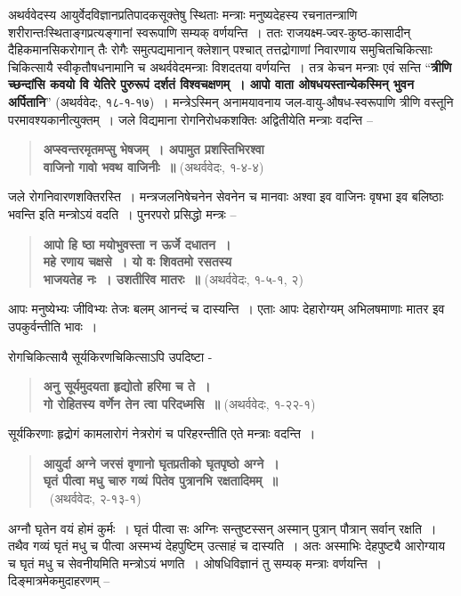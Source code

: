 अथर्ववेदस्य आयुर्वेदविज्ञानप्रतिपादकसूक्तेषु स्थिताः मन्त्राः मनुष्यदेहस्य रचनातन्त्राणि शरीरान्तःस्थिताङ्गप्रत्यङ्गानां स्वरूपाणि सम्यक् वर्णयन्ति~। ततः राजयक्ष्म-ज्वर-कुष्ठ-कासादीन् दैहिकमानसिकरोगान् तैः रोगैः समुत्पद्यमानान् क्लेशान् पश्चात् तत्तद्रोगाणां निवारणाय समुचितचिकित्साः चिकित्सायै स्वीकृतौषधनामानि च अथर्ववेदमन्त्राः विशदतया वर्णयन्ति~। तत्र केचन मन्त्राः एवं सन्ति “\textbf{त्रीणि च्छन्दांसि कवयो वि येतिरे पुरुरूपं दर्शतं विश्वचक्षणम्~। आपो वाता ओषधयस्तान्येकस्मिन् भुवन अर्पितानि}” (अथर्ववेदः, १८-१-१७)~। मन्त्रेऽस्मिन् अनामयावनाय जल-वायु-औषध-स्वरूपाणि त्रीणि वस्तूनि परमावश्यकानीत्युक्तम्~। जले विद्यमाना रोगनिरोधकशक्तिः अद्वितीयेति मन्त्राः वदन्ति –
\begin{verse}
\textbf{अप्स्वन्तरमृतमप्सु भेषजम्~। अपामुत प्रशस्तिभिरश्वा}\\
\textbf{वाजिनो गावो भवथ वाजिनीः~॥} (अथर्ववेदः, १-४-४)
\end{verse}
जले रोगनिवारणशक्तिरस्ति~। मन्त्रजलनिषेचनेन सेवनेन च मानवाः अश्वा इव वाजिनः वृषभा इव बलिष्ठाः भवन्ति इति मन्त्रोऽयं वदति~। पुनरपरो प्रसिद्धो मन्त्रः –

\begin{verse}
\textbf{आपो हि ष्ठा मयोभुवस्ता न ऊर्जे दधातन~।}\\
\textbf{महे रणाय चक्षसे~। यो वः शिवतमो रसतस्य}\\
\textbf{भाजयतेह नः~। उशतीरिव मातरः~॥} (अथर्ववेदः, १-५-१, २)
\end{verse}

आपः मनुष्येभ्यः जीविभ्यः तेजः बलम् आनन्दं च दास्यन्ति~। एताः आपः देहारोग्यम् अभिलषमाणाः मातर इव उपकुर्वन्तीति भावः~।

रोगचिकित्सायै सूर्यकिरणचिकित्साऽपि उपदिष्टा -

\begin{verse}
\textbf{अनु सूर्यमुदयता हृद्योतो हरिमा च ते~।}\\
\textbf{गो रोहितस्य वर्णेन तेन त्वा परिदध्मसि~॥} (अथर्ववेदः, १-२२-१)
\end{verse}

सूर्यकिरणाः हृद्रोगं कामलारोगं नेत्ररोगं च परिहरन्तीति एते मन्त्राः वदन्ति~।

\begin{verse}
\textbf{आयुर्दा अग्ने जरसं वृणानो घृतप्रतीको घृतपृष्ठो अग्ने~।}\\
\textbf{घृतं पीत्वा मधु चारु गव्यं पितेव पुत्रानभि रक्षतादिमम्~॥}\\
~\hfill(अथर्ववेदः, २-१३-१)
\end{verse}

अग्नौ घृतेन वयं होमं कुर्मः~। घृतं पीत्वा सः अग्निः सन्तुष्टस्सन् अस्मान् पुत्रान् पौत्रान् सर्वान् रक्षति~। तथैव गव्यं घृतं मधु च पीत्वा अस्मभ्यं देहपुष्टिम् उत्साहं च दास्यति~। अतः अस्माभिः देहपुष्ट्यै आरोग्याय च घृतं मधु च सेवनीयमिति मन्त्रोऽयं भणति~। ओषधिविज्ञानं तु सम्यक् मन्त्राः वर्णयन्ति~। दिङ्मात्रमेकमुदाहरणम् –

